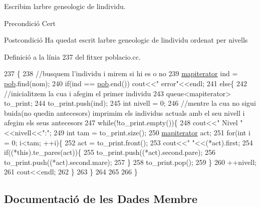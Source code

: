 Escribim l\textquotesingle{}arbre geneologic de l\textquotesingle{}individu. 

\begin{DoxyPrecond}{Precondició}
Cert 
\end{DoxyPrecond}
\begin{DoxyPostcond}{Postcondició}
Ha quedat escrit l\textquotesingle{}arbre geneologic de l\textquotesingle{}individu ordenat per nivells 
\end{DoxyPostcond}


Definició a la línia 237 del fitxer poblacio.\+cc.


\begin{DoxyCode}
237                                                   \{
238   \textcolor{comment}{//busquem l'individu i mirem si hi es o no}
239   \hyperlink{classpoblacio_a52c3d96b08f7679f27487e7499185ed1}{mapiterator} ind = \hyperlink{classpoblacio_a7ecb70033b151a937143b07d489c4c17}{pob}.find(nom);
240   \textcolor{keywordflow}{if}(ind == \hyperlink{classpoblacio_a7ecb70033b151a937143b07d489c4c17}{pob}.end()) cout<<\textcolor{stringliteral}{"  error"}<<endl;
241   \textcolor{keywordflow}{else}\{
242     \textcolor{comment}{//inicialitzem la cua i afegim el primer individu}
243   queue<mapiterator> to\_print;
244   to\_print.push(ind);
245   \textcolor{keywordtype}{int} nivell = 0;
246   \textcolor{comment}{//mentre la cua no sigui buida(no quedin antecesors) imprimim els individus actuals amb el seu nivell i
       afegim els seus antecesors}
247   \textcolor{keywordflow}{while}(!to\_print.empty())\{
248     cout<<\textcolor{stringliteral}{"  Nivel "}<<nivell<<\textcolor{stringliteral}{":"};
249     \textcolor{keywordtype}{int} tam  = to\_print.size();
250     \hyperlink{classpoblacio_a52c3d96b08f7679f27487e7499185ed1}{mapiterator} act;
251     \textcolor{keywordflow}{for}(\textcolor{keywordtype}{int} i = 0; i<tam; ++i)\{
252       act = to\_print.front();
253       cout<<\textcolor{stringliteral}{" "}<<(*act).first;
254       \textcolor{keywordflow}{if}((*this).te\_pares(act))\{
255         to\_print.push((*act).second.pare);
256         to\_print.push((*act).second.mare);
257       \}
258       to\_print.pop();
259     \}
260     ++nivell;
261     cout<<endl;
262   \}
263   \}
264 
265 
266 \}
\end{DoxyCode}


\subsection{Documentació de les Dades Membre}
